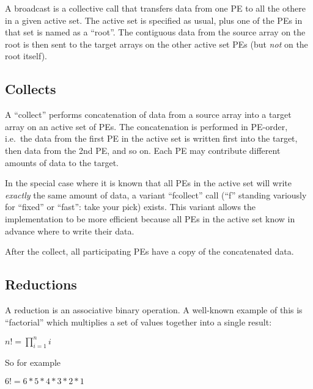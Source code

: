 A broadcast is a collective call that transfers data from one PE to
all the othere in a given active set.  The active set is specified as
usual, plus one of the PEs in that set is named as a ``root''.  The
contiguous data from the source array on the root is then sent to the
target arrays on the other active set PEs (but \emph{not} on the root
itself).

\subsection{Collects}

A ``collect'' performs concatenation of data from a source array into
a target array on an active set of PEs.  The concatenation is
performed in PE-order, i.e.\ the data from the first PE in the active
set is written first into the target, then data from the 2nd PE, and
so on.  Each PE may contribute different amounts of data to the
target.

In the special case where it is known that all PEs in the active set
will write \emph{exactly} the same amount of data, a variant
``fcollect'' call (``f'' standing variously for ``fixed'' or ``fast'':
take your pick) exists.  This variant allows the implementation to be
more efficient because all PEs in the active set know in advance where
to write their data.

After the collect, all participating PEs have a copy of the
concatenated data.

\subsection{Reductions}

A reduction is an associative binary operation.  A well-known example
of this is ``factorial'' which multiplies a set of values together
into a single result:

\vspace{0.2in}

\begin{math}
n! = \prod_{i=1}^n i
\end{math}

\vspace{0.2in}

\noindent
So for example

\vspace{0.2in}

\begin{math}
6! = 6 * 5 * 4 * 3 * 2 * 1
\end{math}


